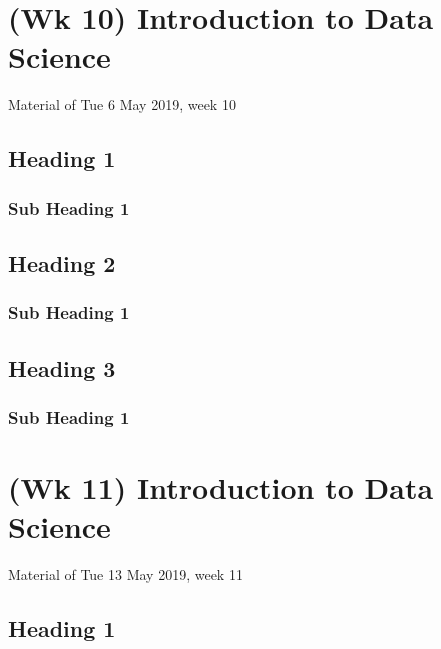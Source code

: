 \documentclass[]{book}
\begin{document}
\hypertarget{wk-10-introduction-to-data-science}{%
\chapter{(Wk 10) Introduction to Data Science}\label{wk-10-introduction-to-data-science}}

Material of Tue 6 May 2019, week 10

\hypertarget{heading-1-7}{%
\section{Heading 1}\label{heading-1-7}}

\hypertarget{sub-heading-1-21}{%
\subsection{Sub Heading 1}\label{sub-heading-1-21}}

\hypertarget{heading-2-7}{%
\section{Heading 2}\label{heading-2-7}}

\hypertarget{sub-heading-1-22}{%
\subsection{Sub Heading 1}\label{sub-heading-1-22}}

\hypertarget{heading-3-7}{%
\section{Heading 3}\label{heading-3-7}}

\hypertarget{sub-heading-1-23}{%
\subsection{Sub Heading 1}\label{sub-heading-1-23}}

\hypertarget{wk-11-introduction-to-data-science}{%
\chapter{(Wk 11) Introduction to Data Science}\label{wk-11-introduction-to-data-science}}

Material of Tue 13 May 2019, week 11

\hypertarget{heading-1-8}{%
\section{Heading 1}\label{heading-1-8}}
\end{document}
